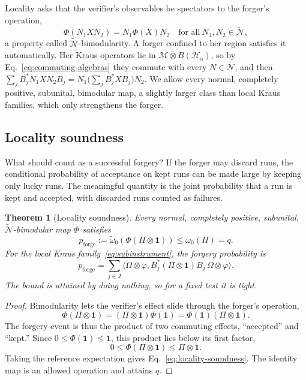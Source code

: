 \documentclass[11pt,a4paper]{article}
\newtheorem{theorem}{Theorem}
\newcommand{\M}{\mathcal{M}}
\newcommand{\N}{\mathcal{N}}
\newcommand{\Hil}{\mathcal{H}}
\begin{document}
Locality asks that the verifier's observables be spectators to the forger's operation,
\begin{equation}
\Phi(N_1XN_2)=N_1\Phi(X)N_2\quad\text{for all}\ N_1,N_2\in\widetilde{\N},
\label{eq:bimodular}
\end{equation}
a property called $\widetilde{\N}$-bimodularity. A forger confined to her region satisfies it automatically. Her Kraus operators lie in $\M\bar\otimes B(\Hil_{\mathrm a})$, so by Eq.~\eqref{eq:commuting-algebras} they commute with every $N\in\widetilde{\N}$, and then $\sum_jB_j^*N_1XN_2B_j=N_1\bigl(\sum_jB_j^*XB_j\bigr)N_2$. We allow every normal, completely positive, subunital, bimodular map, a slightly larger class than local Kraus families, which only strengthens the forger.

\subsection{Locality soundness}

What should count as a successful forgery? If the forger may discard runs, the conditional probability of acceptance on kept runs can be made large by keeping only lucky runs. The meaningful quantity is the joint probability that a run is kept and accepted, with discarded runs counted as failures.

\begin{theorem}[Locality soundness]
\label{thm:locality}
Every normal, completely positive, subunital, $\widetilde{\N}$-bimodular map $\Phi$ satisfies
\begin{equation}
p_{\mathrm{forge}}
:=\widetilde\omega_0\!\left(
\Phi(\Pi\otimes\mathbf{1})\right)
\le\omega_0(\Pi)=q.
\label{eq:locality-soundness}
\end{equation}
For the local Kraus family~\eqref{eq:subinstrument}, the forgery probability is
\begin{equation}
p_{\mathrm{forge}}=\sum_{j\in J}
\langle\Omega\otimes\varphi,
B_j^*(\Pi\otimes\mathbf{1})B_j\,
\Omega\otimes\varphi\rangle.
\label{eq:kraus-forgery}
\end{equation}
The bound is attained by doing nothing, so for a fixed test it is tight.
\end{theorem}

\begin{proof}
Bimodularity lets the verifier's effect slide through the forger's operation,
\begin{equation}
\Phi(\Pi\otimes\mathbf{1})
=(\Pi\otimes\mathbf{1})\Phi(\mathbf{1})
=\Phi(\mathbf{1})(\Pi\otimes\mathbf{1}).
\end{equation}
The forgery event is thus the product of two commuting effects, ``accepted'' and ``kept.'' Since $0\le\Phi(\mathbf{1})\le\mathbf{1}$, this product lies below its first factor,
\begin{equation}
0\le\Phi(\Pi\otimes\mathbf{1})
\le\Pi\otimes\mathbf{1}.
\end{equation}
Taking the reference expectation gives Eq.~\eqref{eq:locality-soundness}. The identity map is an allowed operation and attains $q$.
\end{proof}
\end{document}
